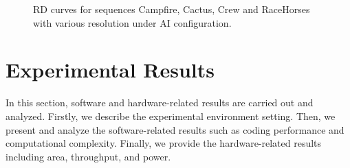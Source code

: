 \documentclass[lettersize,journal]{IEEEtran}
\begin{document}
\begin{figure}[htbp]
	 \hspace{3pt}
	\caption{RD curves for sequences Campfire, Cactus, Crew and RaceHorses with various resolution under AI configuration.}
    \label{RD curves}
\end{figure}

\section{Experimental Results}
\label{sec:5}
In this section, software and hardware-related results are carried out and analyzed. Firstly, we describe the experimental environment setting. Then, we present and analyze the software-related results such as coding performance and computational complexity. Finally, we provide the hardware-related results including area, throughput, and power. 
\end{document}
